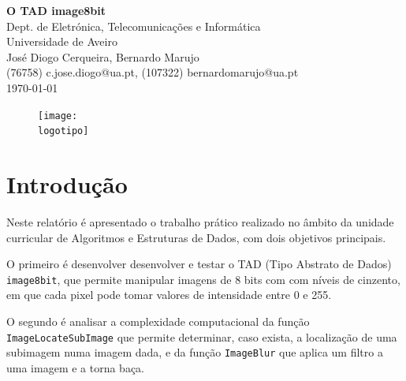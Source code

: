 \documentclass{report}
\begin{document}
%
\def\titulo{O TAD image8bit}
\def\data{\today}
\def\autores{José Diogo Cerqueira, Bernardo Marujo}
\def\autorescontactos{(76758) c.jose.diogo@ua.pt, (107322) bernardomarujo@ua.pt}
\def\departamento{Dept. de Eletrónica, Telecomunicações e Informática}
\def\empresa{Universidade de Aveiro}
\def\logotipo{ua.pdf}
%
%

%
%
\begin{titlepage}

\begin{center}
%
\vspace*{50mm}
%
{\Huge\textbf{\titulo}}\\
{\Large \departamento\\ \empresa}\\
%
\vspace{10mm}
%
%
{\LARGE \autores\\ \autorescontactos} \\ 
%
\vspace{10mm}
%
\data
%
\vspace{20mm}
%
\begin{figure}[h]
\center
\texttt{[image: \\logotipo]}
\end{figure}
%
\end{center}
%
\end{titlepage}


\tableofcontents



\clearpage
{}


\chapter{Introdução}

Neste relatório é apresentado o trabalho prático realizado no âmbito da unidade curricular de Algoritmos e Estruturas de Dados, com dois objetivos principais.
\par
O primeiro é desenvolver desenvolver e testar o TAD (Tipo Abstrato de Dados) \texttt{image8bit}, que permite manipular imagens de 8 bits com com níveis de cinzento, em que cada pixel pode tomar valores de intensidade entre 0 e 255.
\par
O segundo é analisar a complexidade computacional da função \texttt{ImageLocateSubImage} que permite determinar, caso exista, a localização de uma subimagem numa imagem dada, e da função \texttt{ImageBlur} que aplica um filtro a uma imagem e a torna baça.
\end{document}
